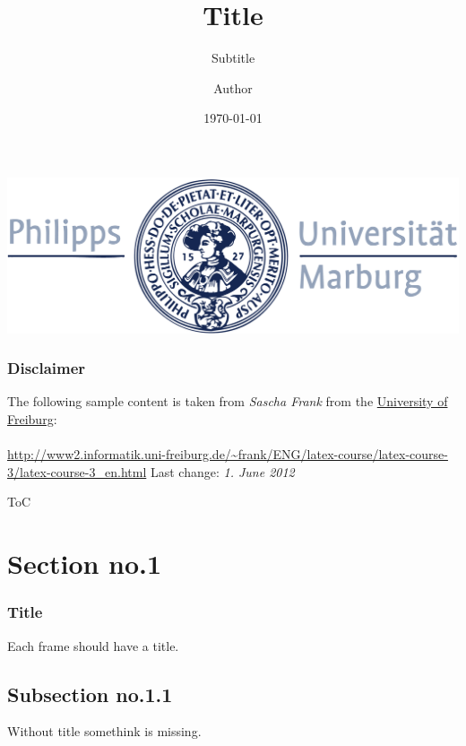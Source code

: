 \documentclass[11pt]{beamer}
\begin{document}
    \author{Author}
    \title{Title}
    \subtitle{Subtitle}
    \date{\today}
    \subject{Subject}

    \begin{frame}[plain]
        \begin{center}
        \hspace{1.5em}\includegraphics[width=.5\paperwidth]{gfx/logo_blue}
        \end{center}
        \vspace{-2em}
        \maketitle
    \end{frame}

    \begin{frame}
        \frametitle{Disclaimer}
        The following sample content is taken from \textit{Sascha Frank} from the \href{https://uni-freiburg.de/}{University of Freiburg}:\\~\\
        \url{http://www2.informatik.uni-freiburg.de/~frank/ENG/latex-course/latex-course-3/latex-course-3_en.html}
        Last change: \textit{1. June 2012}

    \end{frame}

	\begin{frame}{ToC}
		\tableofcontents
	\end{frame}



    \section{Section no.1}
    \begin{frame}\frametitle{Title}
        Each frame should have a title.
    \end{frame}
    \subsection{Subsection no.1.1  }
    \begin{frame}
        Without title somethink is missing.
    \end{frame}
\end{document}
